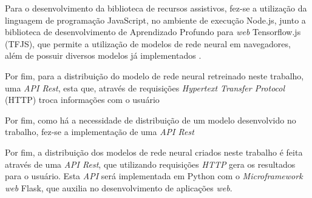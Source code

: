 \par Para o desenvolvimento da biblioteca de recursos assistivos, fez-se a utilização da linguagem de programação JavaScript, no ambiente de execução Node.js, junto a biblioteca de desenvolvimento de Aprendizado Profundo para \textit{web} Tensorflow.js (TFJS), que permite a utilização de modelos de rede neural em navegadores, além de possuir diversos modelos já implementados \cite{tensorflowjs2019}.

\par Por fim, para a distribuição do modelo de rede neural retreinado neste trabalho, uma \textit{API Rest}, esta que, através de requisições \textit{Hypertext Transfer Protocol} (HTTP) troca informações com o usuário 

\par Por fim, como há a necessidade de distribuição de um modelo desenvolvido no trabalho, fez-se a implementação de uma \textit{API Rest}

\par Por fim, a distribuição dos modelos de rede neural criados neste trabalho é feita através de uma \textit{API Rest}, que utilizando requisições \textit{HTTP} gera os resultados para o usuário. Esta \textit{API} será implementada em Python com o \textit{Microframework web} Flask, que auxilia no desenvolvimento de aplicações \textit{web}.





